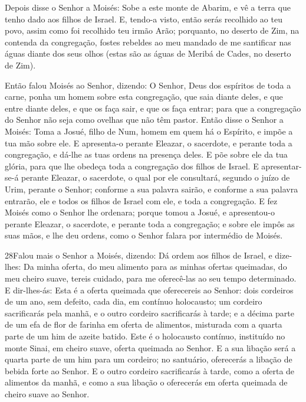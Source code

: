 Depois disse o Senhor a Moisés: Sobe a este monte de Abarim, e vê
a terra que tenho dado aos filhos de Israel. E, tendo-a
visto, então serás recolhido ao teu povo, assim como foi recolhido
teu irmão Arão; porquanto, no deserto de Zim, na contenda da
congregação, fostes rebeldes ao meu mandado de me santificar nas
águas diante dos seus olhos (estas são as águas de Meribá de Cades,
no deserto de Zim).

Então falou Moisés ao Senhor, dizendo: O Senhor, Deus dos
espíritos de toda a carne, ponha um homem sobre esta congregação,
que saia diante deles, e que entre diante deles, e que os
faça sair, e que os faça entrar; para que a congregação do Senhor
não seja como ovelhas que não têm pastor. Então disse o
Senhor a Moisés: Toma a Josué, filho de Num, homem em quem há o
Espírito, e impõe a tua mão sobre ele. E apresenta-o perante
Eleazar, o sacerdote, e perante toda a congregação, e dá-lhe as tuas
ordens na presença deles. E põe sobre ele da tua glória, para
que lhe obedeça toda a congregação dos filhos de Israel. E
apresentar-se-á perante Eleazar, o sacerdote, o qual por ele
consultará, segundo o juízo de Urim, perante o Senhor; conforme a
sua palavra sairão, e conforme a sua palavra entrarão, ele e todos
os filhos de Israel com ele, e toda a congregação. E fez
Moisés como o Senhor lhe ordenara; porque tomou a Josué, e
apresentou-o perante Eleazar, o sacerdote, e perante toda a
congregação; e sobre ele impôs as suas mãos, e lhe deu
ordens, como o Senhor falara por intermédio de Moisés.

\medskip

\lettrine{28} Falou mais o Senhor a Moisés, dizendo: Dá
ordem aos filhos de Israel, e dize-lhes: Da minha oferta, do meu
alimento para as minhas ofertas queimadas, do meu cheiro suave,
tereis cuidado, para me oferecê-las ao seu tempo determinado. E
dir-lhes-ás: Esta é a oferta queimada que oferecereis ao Senhor:
dois cordeiros de um ano, sem defeito, cada dia, em contínuo
holocausto; um cordeiro sacrificarás pela manhã, e o outro
cordeiro sacrificarás à tarde; e a décima parte de um efa de
flor de farinha em oferta de alimentos, misturada com a quarta parte
de um him de azeite batido. Este é o holocausto contínuo,
instituído no monte Sinai, em cheiro suave, oferta queimada ao
Senhor. E a sua libação será a quarta parte de um him para um
cordeiro; no santuário, oferecerás a libação de bebida forte ao
Senhor. E o outro cordeiro sacrificarás à tarde, como a oferta
de alimentos da manhã, e como a sua libação o oferecerás em oferta
queimada de cheiro suave ao Senhor.

